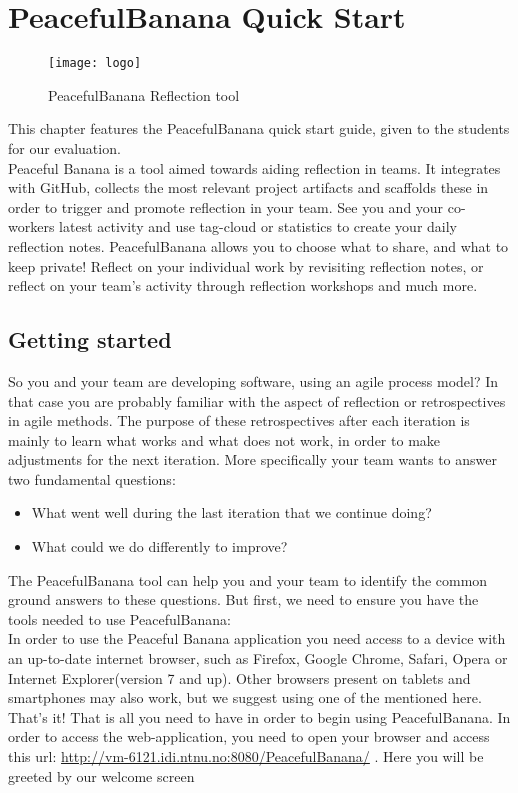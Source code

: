\newpage
\thispagestyle{empty}
\mbox{}
\chapter{PeacefulBanana Quick Start}

\begin{figure}[h!]
\label{logo}
\centering
	\texttt{[image: logo]}
\caption{PeacefulBanana Reflection tool}
\end{figure}

This chapter features the PeacefulBanana quick start guide, given to the students for our evaluation. \\
Peaceful Banana is a tool aimed towards aiding reflection in teams. It integrates with GitHub, collects the most relevant project artifacts and scaffolds these in order to trigger and promote reflection in your team.
See you and your co-workers latest activity and use tag-cloud or statistics to create your daily reflection notes. PeacefulBanana allows you to choose what to share, and what to keep private! Reflect on your individual work by revisiting reflection notes, or reflect on your team's activity through reflection workshops and much more. 
\pagebreak

\section{Getting started}
So you and your team are developing software, using an agile process model? In that case you are probably familiar with the aspect of reflection or retrospectives in agile methods. The purpose of these retrospectives after each iteration is mainly to learn what works and what does not work, in order to make adjustments for the next iteration. More specifically your team wants to answer two fundamental questions:
\begin{itemize}
\item What went well during the last iteration that we continue doing? 
\item What could we do differently to improve?
\end{itemize}

The PeacefulBanana tool can help you and your team to identify the common ground answers to these questions. But first, we need to ensure you have the tools needed to use PeacefulBanana: \\
In order to use the Peaceful Banana application you need access to a device with an up-to-date internet browser, such as Firefox, Google Chrome, Safari, Opera or Internet Explorer(version 7 and up). Other browsers present on tablets and smartphones may also work, but we suggest using one of the mentioned here. \\
That's it! That is all you need to have in order to begin using PeacefulBanana. 
In order to access the web-application, you need to open your browser and access this url: \url{http://vm-6121.idi.ntnu.no:8080/PeacefulBanana/} . Here you will be greeted by our welcome screen\\

